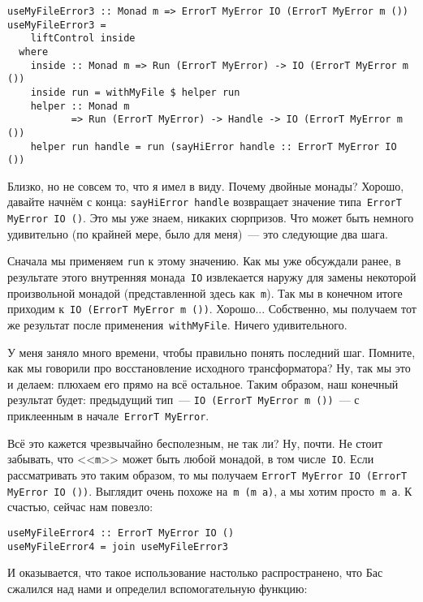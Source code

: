 \begin{lstlisting}
useMyFileError3 :: Monad m => ErrorT MyError IO (ErrorT MyError m ())
useMyFileError3 =
    liftControl inside
  where
    inside :: Monad m => Run (ErrorT MyError) -> IO (ErrorT MyError m ())
    inside run = withMyFile $ helper run
    helper :: Monad m
           => Run (ErrorT MyError) -> Handle -> IO (ErrorT MyError m ())
    helper run handle = run (sayHiError handle :: ErrorT MyError IO ())
\end{lstlisting}

Близко, но не совсем то, что я имел в виду. Почему двойные монады? Хорошо,
давайте начнём с конца: \lstinline'sayHiError handle' возвращает значение
типа~\lstinline'ErrorT MyError IO ()'.  Это мы уже знаем, никаких сюрпризов.
Что может быть немного удивительно (по крайней мере, было для меня)~--- это
следующие два шага.

Сначала мы применяем \lstinline'run' к этому значению. Как мы уже обсуждали
ранее, в результате этого внутренняя монада~\lstinline'IO' извлекается наружу
для замены некоторой произвольной монадой (представленной здесь
как~\lstinline'm'). Так мы в конечном итоге приходим
к~\lstinline'IO (ErrorT MyError m ())'.
Хорошо... Собственно, мы получаем тот же результат после
применения~\lstinline'withMyFile'. Ничего удивительного.

У меня заняло много времени, чтобы правильно понять последний шаг. Помните, как
мы говорили про восстановление исходного трансформатора? Ну, так мы это и
делаем: плюхаем его прямо на всё остальное. Таким образом, наш конечный
результат будет: предыдущий тип~--- \lstinline'IO (ErrorT MyError m ())'~--- с
приклеенным в начале~\lstinline'ErrorT MyError'.

Всё это кажется чрезвычайно бесполезным, не так ли? Ну, почти. Не стоит
забывать, что <<\lstinline'm'>> может быть любой монадой, в том
числе~\lstinline'IO'. Если рассматривать это таким образом, то мы получаем
\lstinline'ErrorT MyError IO (ErrorT MyError IO ())'. Выглядит очень похоже
на~\lstinline'm (m a)', а мы хотим просто~\lstinline'm a'. К счастью, сейчас
нам повезло:

\begin{lstlisting}
useMyFileError4 :: ErrorT MyError IO ()
useMyFileError4 = join useMyFileError3
\end{lstlisting}

И оказывается, что такое использование настолько распространено, что Бас
сжалился над нами и определил вспомогательную функцию:


